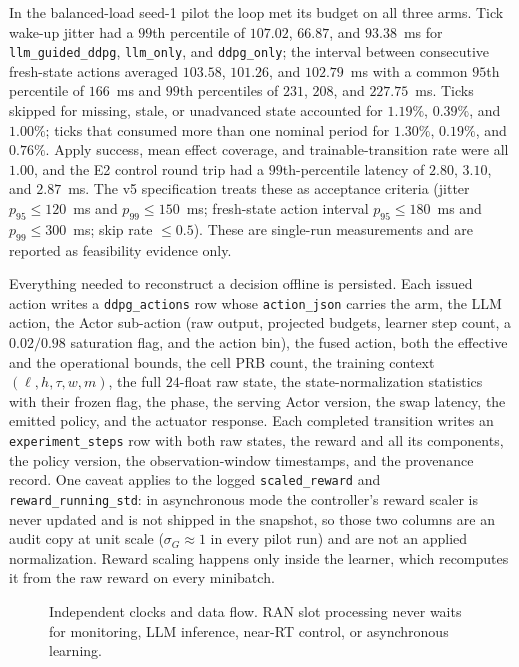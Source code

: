 In the balanced-load seed-1 pilot the loop met its budget on all three arms. Tick wake-up jitter had a $99$th percentile of $107.02$, $66.87$, and $93.38$~ms for \texttt{llm\_guided\_ddpg}, \texttt{llm\_only}, and \texttt{ddpg\_only}; the interval between consecutive fresh-state actions averaged $103.58$, $101.26$, and $102.79$~ms with a common $95$th percentile of $166$~ms and $99$th percentiles of $231$, $208$, and $227.75$~ms. Ticks skipped for missing, stale, or unadvanced state accounted for $1.19\%$, $0.39\%$, and $1.00\%$; ticks that consumed more than one nominal period for $1.30\%$, $0.19\%$, and $0.76\%$. Apply success, mean effect coverage, and trainable-transition rate were all $1.00$, and the E2 control round trip had a $99$th-percentile latency of $2.80$, $3.10$, and $2.87$~ms. The v5 specification treats these as acceptance criteria (jitter $p_{95}\leq120$~ms and $p_{99}\leq150$~ms; fresh-state action interval $p_{95}\leq180$~ms and $p_{99}\leq300$~ms; skip rate $\leq0.5$).\ifFullCampaign\else{} These are single-run measurements and are reported as feasibility evidence only.\fi

Everything needed to reconstruct a decision offline is persisted. Each issued action writes a \texttt{ddpg\_actions} row whose \texttt{action\_json} carries the arm, the LLM action, the Actor sub-action (raw output, projected budgets, learner step count, a $0.02/0.98$ saturation flag, and the action bin), the fused action, both the effective and the operational bounds, the cell PRB count, the training context $(\ell,h,\tau,w,m)$, the full $24$-float raw state, the state-normalization statistics with their frozen flag, the phase, the serving Actor version, the swap latency, the emitted policy, and the actuator response. Each completed transition writes an \texttt{experiment\_steps} row with both raw states, the reward and all its components, the policy version, the observation-window timestamps, and the provenance record. One caveat applies to the logged \texttt{scaled\_reward} and \texttt{reward\_running\_std}: in asynchronous mode the controller's reward scaler is never updated and is not shipped in the snapshot, so those two columns are an audit copy at unit scale ($\sigma_G\approx1$ in every pilot run) and are not an applied normalization. Reward scaling happens only inside the learner, which recomputes it from the raw reward on every minibatch.

\begin{figure}[t]
  \centering
  
  \caption{Independent clocks and data flow. RAN slot processing never waits for monitoring, LLM inference, near-RT control, or asynchronous learning.}
  \label{fig:timing}
\end{figure}

